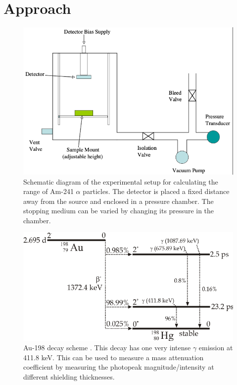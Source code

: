 \section{Approach}

\begin{figure}[t!]
\centering
\includegraphics[scale=0.5]{alpha_setup.png}
\caption{Schematic diagram of the experimental setup for calculating the range of Am-241 $\alpha$ particles. The detector is placed a fixed distance away from the source and enclosed in a pressure chamber. The stopping medium can be varied by changing its pressure in the chamber.}
\label{fig:alpha-setup}
\end{figure}

\begin{figure}
\centering
\includegraphics[scale=0.4]{au198.png}
\caption{Au-198 decay scheme \cite{dataset}. This decay has one very intense $\gamma$ emission at 411.8 keV. This can be used to measure a mass attenuation coefficient by measuring the photopeak magnitude/intensity at different shielding thicknesses.}
\label{fig:au198}
\end{figure}

